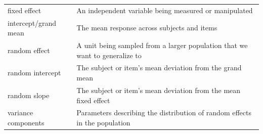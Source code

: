 \documentclass[man,floatsintext]{apa6}
\begin{document}
\begin{appendix}
\begin{longtable}[]{@{}ll@{}}
\begin{minipage}[t]{0.27\columnwidth}
fixed effect\strut
\end{minipage} & \begin{minipage}[t]{0.67\columnwidth}\raggedright
An independent variable being measured or manipulated\strut
\end{minipage}\tabularnewline
\begin{minipage}[t]{0.27\columnwidth}\raggedright
intercept/grand mean\strut
\end{minipage} & \begin{minipage}[t]{0.67\columnwidth}\raggedright
The mean response across subjects and items\strut
\end{minipage}\tabularnewline
\begin{minipage}[t]{0.27\columnwidth}\raggedright
random effect\strut
\end{minipage} & \begin{minipage}[t]{0.67\columnwidth}\raggedright
A unit being sampled from a larger population that we want to generalize
to\strut
\end{minipage}\tabularnewline
\begin{minipage}[t]{0.27\columnwidth}\raggedright
random intercept\strut
\end{minipage} & \begin{minipage}[t]{0.67\columnwidth}\raggedright
The subject or item's mean deviation from the grand mean\strut
\end{minipage}\tabularnewline
\begin{minipage}[t]{0.27\columnwidth}\raggedright
random slope\strut
\end{minipage} & \begin{minipage}[t]{0.67\columnwidth}\raggedright
The subject or item's mean deviation from the mean fixed effect\strut
\end{minipage}\tabularnewline
\begin{minipage}[t]{0.27\columnwidth}\raggedright
variance components\strut
\end{minipage} & \begin{minipage}[t]{0.67\columnwidth}\raggedright
Parameters describing the distribution of random effects in the
population\strut
\end{minipage}\tabularnewline
\bottomrule
\end{longtable}
\end{appendix}
\end{document}

